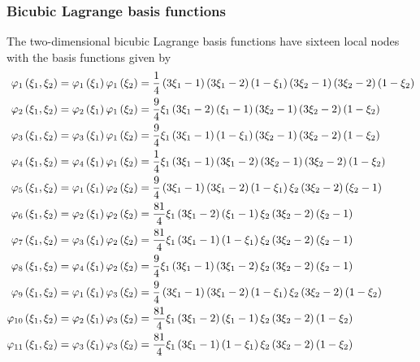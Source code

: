 \subsubsection{Bicubic Lagrange basis functions}

The two-dimensional bicubic Lagrange basis functions have sixteen local nodes
with the basis functions given by
\begin{equation}
  \begin{split}
    \lbfn{1}{\xione,\xitwo}&=\lbfn{1}{\xione}\lbfn{1}{\xitwo}=
    \frac14\pbrac{3\xione-1}\pbrac{3\xione-2}\pbrac{1-\xione}\pbrac{3\xitwo-1}\pbrac{3\xitwo-2}\pbrac{1-\xitwo} \\
    \lbfn{2}{\xione,\xitwo}&=\lbfn{2}{\xione}\lbfn{1}{\xitwo}=
    \frac94\xione\pbrac{3\xione-2}\pbrac{\xione-1}\pbrac{3\xitwo-1}\pbrac{3\xitwo-2}\pbrac{1-\xitwo} \\
    \lbfn{3}{\xione,\xitwo}&=\lbfn{3}{\xione}\lbfn{1}{\xitwo}=
    \frac94\xione\pbrac{3\xione-1}\pbrac{1-\xione}\pbrac{3\xitwo-1}\pbrac{3\xitwo-2}\pbrac{1-\xitwo} \\
    \lbfn{4}{\xione,\xitwo}&=\lbfn{4}{\xione}\lbfn{1}{\xitwo}=
    \frac14\xione\pbrac{3\xione-1}\pbrac{3\xione-2}\pbrac{3\xitwo-1}\pbrac{3\xitwo-2}\pbrac{1-\xitwo} \\
    \lbfn{5}{\xione,\xitwo}&=\lbfn{1}{\xione}\lbfn{2}{\xitwo}=
    \frac94\pbrac{3\xione-1}\pbrac{3\xione-2}\pbrac{1-\xione}\xitwo\pbrac{3\xitwo-2}\pbrac{\xitwo-1} \\
    \lbfn{6}{\xione,\xitwo}&=\lbfn{2}{\xione}\lbfn{2}{\xitwo}=
    \frac{81}{4}\xione\pbrac{3\xione-2}\pbrac{\xione-1}\xitwo\pbrac{3\xitwo-2}\pbrac{\xitwo-1} \\
    \lbfn{7}{\xione,\xitwo}&=\lbfn{3}{\xione}\lbfn{2}{\xitwo}=
    \frac{81}{4}\xione\pbrac{3\xione-1}\pbrac{1-\xione}\xitwo\pbrac{3\xitwo-2}\pbrac{\xitwo-1} \\
    \lbfn{8}{\xione,\xitwo}&=\lbfn{4}{\xione}\lbfn{2}{\xitwo}=
    \frac94\xione\pbrac{3\xione-1}\pbrac{3\xione-2}\xitwo\pbrac{3\xitwo-2}\pbrac{\xitwo-1} \\
    \lbfn{9}{\xione,\xitwo}&=\lbfn{1}{\xione}\lbfn{3}{\xitwo}=
    \frac94\pbrac{3\xione-1}\pbrac{3\xione-2}\pbrac{1-\xione}\xitwo\pbrac{3\xitwo-2}\pbrac{1-\xitwo} \\
    \lbfn{10}{\xione,\xitwo}&=\lbfn{2}{\xione}\lbfn{3}{\xitwo}=
    \frac{81}{4}\xione\pbrac{3\xione-2}\pbrac{\xione-1}\xitwo\pbrac{3\xitwo-2}\pbrac{1-\xitwo} \\
    \lbfn{11}{\xione,\xitwo}&=\lbfn{3}{\xione}\lbfn{3}{\xitwo}=
    \frac{81}{4}\xione\pbrac{3\xione-1}\pbrac{1-\xione}\xitwo\pbrac{3\xitwo-2}\pbrac{1-\xitwo} \\

\end{split}
\end{equation}
